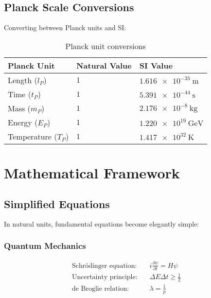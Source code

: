 \documentclass[11pt,a4paper]{article}
\begin{document}
	\subsection{Planck Scale Conversions}
	
	Converting between Planck units and SI:
	
	\begin{table}[htbp]
		\centering
		\begin{adjustbox}{width=0.8\textwidth}
			\begin{tabular}{lll}
				\toprule
				\textbf{Planck Unit} & \textbf{Natural Value} & \textbf{SI Value} \\
				\midrule
				Length ($l_P$) & $1$ & $\SI{1.616e-35}{\meter}$ \\
				Time ($t_P$) & $1$ & $\SI{5.391e-44}{\second}$ \\
				Mass ($m_P$) & $1$ & $\SI{2.176e-8}{\kilogram}$ \\
				Energy ($E_P$) & $1$ & $\SI{1.220e19}{\giga\electronvolt}$ \\
				Temperature ($T_P$) & $1$ & $\SI{1.417e32}{\kelvin}$ \\
				\bottomrule
			\end{tabular}
		\end{adjustbox}
		\caption{Planck unit conversions}
		\label{tab:planck_conversions}
	\end{table}
	
	\section{Mathematical Framework}
	
	\subsection{Simplified Equations}
	
	In natural units, fundamental equations become elegantly simple:
	
	\subsubsection{Quantum Mechanics}
	\begin{align}
		\text{Schrödinger equation:} \quad & i\frac{\partial\psi}{\partial t} = H\psi \\
		\text{Uncertainty principle:} \quad & \Delta E \Delta t \geq \frac{1}{2} \\
		\text{de Broglie relation:} \quad & \lambda = \frac{1}{p}
	\end{align}
	
\end{document}
